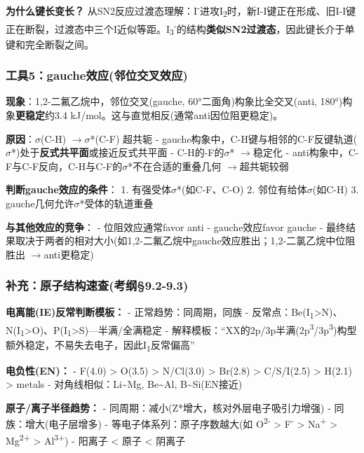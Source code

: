 \documentclass[a4paper,11pt]{ctexart}
\newcommand{\箭}{\ensuremath{\rightarrow}}
\newcommand{\左箭}{\ensuremath{\leftarrow}}
\newcommand{\上箭}{\ensuremath{\uparrow}}
\newcommand{\下箭}{\ensuremath{\downarrow}}
\newcommand{\衡}{\ensuremath{\rightleftharpoons}}
\newcommand{\双箭}{\ensuremath{\leftrightarrow}}
\newcommand{\约等于}{\ensuremath{\approx}}
\newcommand{\小于等于}{\ensuremath{\leq}}
\newcommand{\大于等于}{\ensuremath{\geq}}
\newcommand{\不等于}{\ensuremath{\neq}}
\newcommand{\西格马}{\ensuremath{\sigma}}
\newcommand{\派}{\ensuremath{\pi}}
\begin{document}
\textbf{为什么键长变长？} 从SN2反应过渡态理解：I\textsuperscript{-}进攻I\textsubscript{2}时，新I-I键正在形成、旧I-I键正在断裂，过渡态中三个I近似等距。I\textsubscript{3}\textsuperscript{-}的结构\textbf{类似SN2过渡态}，因此键长介于单键和完全断裂之间。

\subsubsection{工具5：gauche效应(邻位交叉效应)}\label{ux5de5ux51775gaucheux6548ux5e94ux90bbux4f4dux4ea4ux53c9ux6548ux5e94}

\textbf{现象}：1,2-二氟乙烷中，邻位交叉(gauche, 60°二面角)构象比全交叉(anti, 180°)构象\textbf{更稳定}约3.4 kJ/mol。这与直觉相反(通常anti因位阻更稳定)。

\textbf{原因}：\西格马(C-H) \箭 \西格马*(C-F) 超共轭
- gauche构象中，C-H键与相邻的C-F反键轨道(\西格马*)处于\textbf{反式共平面}或接近反式共平面
- C-H的-F的\西格马* \箭 稳定化
- anti构象中，C-F与C-F反向，C-H与C-F的\西格马*不在合适的重叠几何 \箭 超共轭较弱

\textbf{判断gauche效应的条件}：
1. 有强受体\西格马*(如C-F、C-O)
2. 邻位有给体\西格马(如C-H)
3. gauche几何允许\西格马*受体的轨道重叠

\textbf{与其他效应的竞争}：
- 位阻效应通常favor anti
- gauche效应favor gauche
- 最终结果取决于两者的相对大小(如1,2-二氟乙烷中gauche效应胜出；1,2-二氯乙烷中位阻胜出 \箭 anti更稳定)

\subsubsection{补充：原子结构速查(考纲§9.2-9.3)}\label{ux8865ux5145ux539fux5b50ux7ed3ux6784ux901fux67e5ux8003ux7eb29.2-9.3}

\textbf{电离能(IE)反常判断模板：}
- 正常趋势：同周期，同族
- 反常点：Be(I\textsubscript{1}\textgreater N)、N(I\textsubscript{1}\textgreater O)、P(I\textsubscript{1}\textgreater S)---半满/全满稳定
- 解释模板：``XX的2p/3p半满(2p\textsuperscript{3}/3p\textsuperscript{3})构型额外稳定，不易失去电子，因此I\textsubscript{1}反常偏高''

\textbf{电负性(EN)：}
- F(4.0) \textgreater{} O(3.5) \textgreater{} N/Cl(3.0) \textgreater{} Br(2.8) \textgreater{} C/S/I(2.5) \textgreater{} H(2.1) \textgreater{} metals
- 对角线相似：Li\textasciitilde Mg, Be\textasciitilde Al, B\textasciitilde Si(EN接近)

\textbf{原子/离子半径趋势：}
- 同周期：减小(Z*增大，核对外层电子吸引力增强)
- 同族：增大(电子层增多)
- 等电子体系列：原子序数越大(如 O\textsuperscript{2-} \textgreater{} F\textsuperscript{-} \textgreater{} Na\textsuperscript{+} \textgreater{} Mg\textsuperscript{2+} \textgreater{} Al\textsuperscript{3+})
- 阳离子 \textless{} 原子 \textless{} 阴离子
\end{document}
